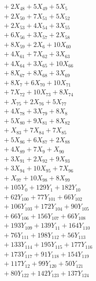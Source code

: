 \documentclass[a4paper,10pt]{article}
\begin{document}
{\begin{align}
&\quad  + 2X_{48} + 5X_{49} + 5X_{5} \\[0.5ex]
&\quad  + 2X_{50} + 7X_{51} + 5X_{52} \\[0.5ex]
&\quad  + 2X_{53} + 4X_{54} + 3X_{55} \\[0.5ex]
&\quad  + 6X_{56} + 3X_{57} + 2X_{58} \\[0.5ex]
&\quad  + 8X_{59} + 2X_{6} + 10X_{60} \\[0.5ex]
&\quad  + 4X_{61} + 7X_{62} + 3X_{63} \\[0.5ex]
&\quad  + 4X_{64} + 3X_{65} + 10X_{66} \\[0.5ex]
&\quad  + 8X_{67} + 8X_{68} + 3X_{69} \\[0.5ex]
&\quad  + 8X_{7} + 6X_{70} + 10X_{71} \\[0.5ex]
&\quad  + 7X_{72} + 10X_{73} + 8X_{74} \\[0.5ex]
&\quad  + X_{75} + 2X_{76} + 5X_{77} \\[0.5ex]
&\quad  + 4X_{78} + 3X_{79} + 8X_{8} \\[0.5ex]
&\quad  + 5X_{80} + 9X_{81} + 8X_{82} \\[0.5ex]
&\quad  + X_{83} + 7X_{84} + 7X_{85} \\[0.5ex]
&\quad  + 5X_{86} + 6X_{87} + 2X_{88} \\[0.5ex]
&\quad  + 4X_{89} + 7X_{9} + X_{90} \\[0.5ex]
&\quad  + 3X_{91} + 2X_{92} + 9X_{93} \\[0.5ex]
&\quad  + 3X_{94} + 10X_{95} + 7X_{96} \\[0.5ex]
&\quad  + X_{97} + 10X_{98} + 8X_{99} \\[0.5ex]
&\quad  + 105Y_{0} + 129Y_{1} + 182Y_{10} \\[0.5ex]
&\quad  + 62Y_{100} + 77Y_{101} + 66Y_{102} \\[0.5ex]
&\quad  + 106Y_{103} + 172Y_{104} + 90Y_{105} \\[0.5ex]
&\quad  + 66Y_{106} + 156Y_{107} + 66Y_{108} \\[0.5ex]
&\quad  + 193Y_{109} + 139Y_{11} + 164Y_{110} \\[0.5ex]
&\quad  + 76Y_{111} + 198Y_{112} + 56Y_{113} \\[0.5ex]
&\quad  + 133Y_{114} + 195Y_{115} + 177Y_{116} \\[0.5ex]
&\quad  + 173Y_{117} + 91Y_{118} + 154Y_{119} \\[0.5ex]
&\quad  + 117Y_{12} + 99Y_{120} + 50Y_{121} \\[0.5ex]
&\quad  + 80Y_{122} + 142Y_{123} + 137Y_{124} \\[0.5ex]

\end{align}}
\end{document}
